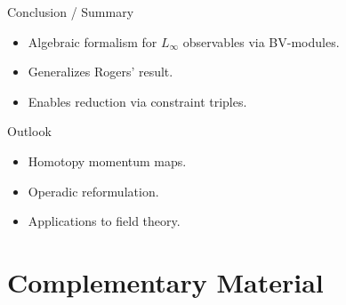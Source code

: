 \documentclass[handout,10pt]{beamer}
\begin{document}
\begin{frame}{Conclusion / Summary}
\begin{itemize}
  \item Algebraic formalism for $L_\infty$ observables via BV-modules.
  \item Generalizes Rogers' result.
  \item Enables reduction via constraint triples.
\end{itemize}
\end{frame}

\begin{frame}{Outlook}
\begin{itemize}
  \item Homotopy momentum maps.
  \item Operadic reformulation.
  \item Applications to field theory.
\end{itemize}
\end{frame}



\appendix
\section{Complementary Material}

\end{document}
